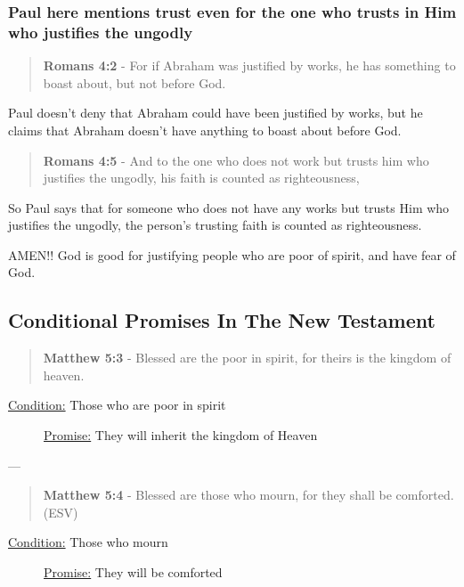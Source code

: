 \documentclass[11pt]{article}
\begin{document}
\subsubsection{Paul here mentions trust even for the one who trusts in Him who justifies the ungodly}
\label{sec:org05f2868}
\begin{quote}
\textbf{Romans 4:2} - For if Abraham was justified by works, he has something to boast about, but not before God.
\end{quote}

Paul doesn't deny that Abraham could have been
justified by works, but he claims that Abraham
doesn't have anything to boast about before
God.

\begin{quote}
\textbf{Romans 4:5} - And to the one who does not work but trusts him who justifies the ungodly, his faith is counted as righteousness,
\end{quote}

So Paul says that for someone who does not
have any works but trusts Him who justifies
the ungodly, the person's trusting faith is
counted as righteousness.

AMEN!! God is good for justifying people who are poor of spirit, and have fear of God.

\subsection{Conditional Promises In The New Testament}
\label{sec:org587a865}
\begin{quote}
\textbf{Matthew 5:3} - Blessed are the poor in spirit, for theirs is the kingdom of heaven.
\end{quote}

\begin{description}
\item[{\uline{Condition:} Those who are poor in spirit}] \uline{Promise:} They will inherit the kingdom of Heaven
\end{description}

---

\begin{quote}
\textbf{Matthew 5:4} - Blessed are those who mourn, for they shall be comforted. (ESV)
\end{quote}

\begin{description}
\item[{\uline{Condition:} Those who mourn}] \uline{Promise:} They will be comforted
\end{description}
\end{document}
